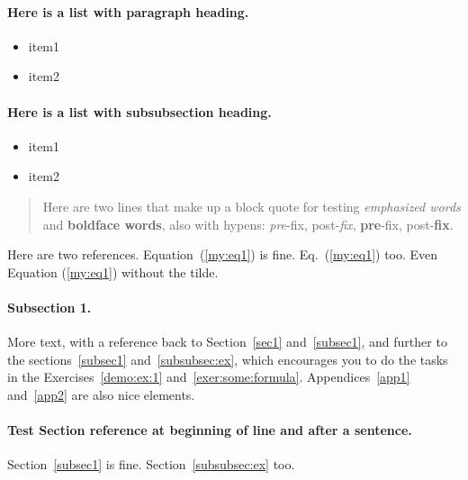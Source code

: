 \documentclass[%
oneside,                 %
final,                   %
10pt]{article}
\theoremstyle{definition}
\begin{document}
\noindent
\paragraph{Here is a list with paragraph heading.}

\begin{itemize}
  \item item1

  \item item2
\end{itemize}

\noindent
\paragraph{Here is a list with subsubsection heading.}
\begin{itemize}
  \item item1

  \item item2
\end{itemize}

\noindent

\begin{quote}
Here are two lines that make up
a block quote for testing \emph{emphasized words} and \textbf{boldface words},
also with hypens:
\emph{pre}-fix, post-\emph{fix}, \textbf{pre}-fix, post-\textbf{fix}.
\end{quote}


Here are two references. Equation~(\ref{my:eq1}) is fine. Eq.~(\ref{my:eq1}) too.
Even Equation (\ref{my:eq1}) without the tilde.

\paragraph{Subsection 1.}
\label{subsec1}



More text, with a reference back to
Section~\vref{sec1} and~\vref{subsec1}, and further to the
sections~\vref{subsec1} and~\vref{subsubsec:ex}, which
encourages you to do the tasks in the
Exercises~\vref{demo:ex:1} and~\vref{exer:some:formula}.
Appendices~\vref{app1} and~\vref{app2} are also nice elements.

\paragraph{Test Section reference at beginning of line and after a sentence.}
Section~\vref{subsec1} is fine.
Section~\vref{subsubsec:ex} too.
\end{document}
